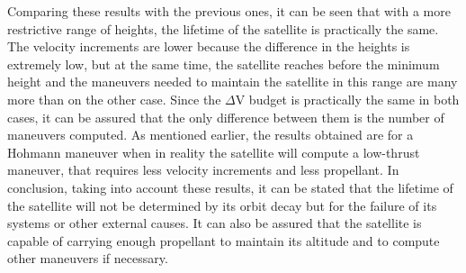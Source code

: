 Comparing these results with the previous ones, it can be seen that with a more restrictive range of heights, the lifetime of the satellite is practically the same. The velocity increments are lower because the difference in the heights is extremely low, but at the same time, the satellite reaches before the minimum height and the maneuvers needed to maintain the satellite in this range are many more than on the other case. Since the $\Delta$V budget is practically the same in both cases, it can be assured that the only difference between them is the number of maneuvers computed.
\newline
As mentioned earlier, the results obtained are for a Hohmann maneuver when in reality the satellite will compute a low-thrust maneuver, that requires less velocity increments and less propellant. In conclusion, taking into account these results, it can be stated that the lifetime of the satellite will not be determined by its orbit decay but for the failure of its systems or other external causes. It can also be assured that the satellite is capable of carrying enough propellant to maintain its altitude and to compute other maneuvers if necessary.